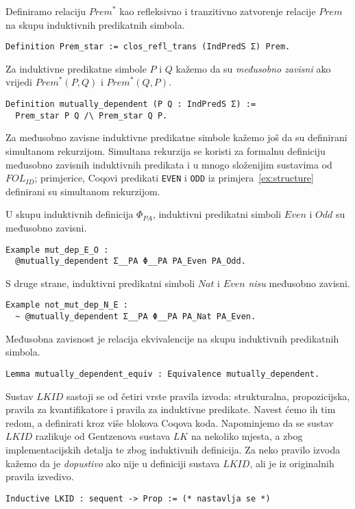\begin{definition}
  Definiramo relaciju \(\mathit{Prem}^{\ast}\) kao refleksivno i tranzitivno zatvorenje relacije \(\mathit{Prem}\) na skupu induktivnih predikatnih simbola.
\begin{verbatim}
Definition Prem_star := clos_refl_trans (IndPredS Σ) Prem.
\end{verbatim}
  \noindent Za induktivne predikatne simbole \(P\) i \(Q\) kažemo da su
  \textit{međusobno zavisni} ako vrijedi \(\mathit{Prem}^{\ast}(P, Q)\) i \(\mathit{Prem}^{\ast}(Q, P)\).
\begin{verbatim}
Definition mutually_dependent (P Q : IndPredS Σ) :=
  Prem_star P Q /\ Prem_star Q P.
\end{verbatim}
  \noindent Za međusobno zavisne induktivne predikatne simbole kažemo još da su
  definirani simultanom rekurzijom.
  Simultana rekurzija se koristi za formalnu definiciju međusobno zavisnih induktivnih predikata
  i u mnogo složenijim sustavima od \(\mathit{FOL}_{\mathit{ID}}\); primjerice,
  Coqovi predikati \texttt{EVEN} i \texttt{ODD} iz primjera~\ref{ex:structure}
  definirani su simultanom rekurzijom.
\end{definition}

\begin{example}
  U skupu induktivnih definicija \(\Phi_{\mathit{PA}}\),
  induktivni predikatni simboli \(\mathit{Even}\) i \(\mathit{Odd}\)
  su međusobno zavisni.
\begin{verbatim}
Example mut_dep_E_O :
  @mutually_dependent Σ__PA Φ__PA PA_Even PA_Odd.
\end{verbatim}
  \noindent S druge strane, induktivni predikatni simboli \(\mathit{Nat}\) i \(\mathit{Even}\)
  \textit{nisu} međusobno zavisni.
\begin{verbatim}
Example not_mut_dep_N_E :
  ~ @mutually_dependent Σ__PA Φ__PA PA_Nat PA_Even.
\end{verbatim}
\end{example}

\begin{lemma}
  Međusobna zavisnost je relacija ekvivalencije na skupu induktivnih predikatnih simbola.
\begin{verbatim}
Lemma mutually_dependent_equiv : Equivalence mutually_dependent.
\end{verbatim}
\end{lemma}

Sustav \(\mathit{LKID}\) sastoji se od četiri vrste pravila izvoda:
strukturalna, propozicijska, pravila za kvantifikatore i pravila za induktivne predikate.
Navest ćemo ih tim redom, a definirati kroz više blokova Coqova koda.
Napominjemo da se sustav \(\mathit{LKID}\) razlikuje od Gentzenova sustava \(\mathit{LK}\)
na nekoliko mjesta, a zbog implementacijskih detalja te zbog induktivnih definicija.
Za neko pravilo izvoda kažemo da je \textit{dopustivo} ako nije u definiciji sustava \(\mathit{LKID}\),
ali je iz originalnih pravila izvedivo.
\begin{verbatim}
Inductive LKID : sequent -> Prop := (* nastavlja se *)
\end{verbatim}
